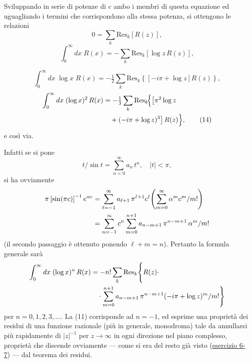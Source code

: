 \documentclass[11pt, a4paper]{book}
\numberwithin{equation}{section}
\begin{document}
Sviluppando in serie di potenze di $c$ ambo i membri di questa equazione
ed uguagliando i termini che corrispondono alla stessa potenza, si ottengono
le relazioni
\begin{equation}
    0 = \sum_k \mathrm{Res}_k\!\left[R(z)\right], \tag{11}
\end{equation}
\begin{equation}
    \int_0^\infty dx\; R(x) = -\sum_k \mathrm{Res}_k\!\left[\log z\, R(z)\right], \tag{12}
\end{equation}


\begin{equation}
    \int_0^\infty dx\; \log x\; R(x) = -\tfrac{1}{2}\sum_k \mathrm{Res}_k\!\left\{
    \left[-i\pi + \log z\right] R(z)\right\}, \tag{13}
\end{equation}
\begin{align}
    \int_0^\infty dx\;(\log x)^2\, R(x) &= -\tfrac{1}{3}\sum_k \mathrm{Res}_k\!\Bigl\{
    \bigl[\pi^2 \log z \notag\\
    &\quad + (-i\pi + \log z)^3\bigr]\, R(z)\Bigr\}, \tag{14}
\end{align}
e così via.

Infatti se si pone
\[
    t/\sin t = \sum_{n=0}^\infty a_n\, t^n, \quad |t| < \pi,
\]
si ha ovviamente
\begin{align}
    \pi\left[\sin(\pi c)\right]^{-1} e^{\alpha c}
    &= \sum_{\ell=-1}^\infty a_{\ell+1}\, \pi^{\ell+1} c^\ell
       \Biggl(\sum_{m=0}^\infty \alpha^m c^m / m!\Biggr) \notag\\
    &= \sum_{n=-1}^\infty c^n \sum_{m=0}^{n+1} a_{n-m+1}\, \pi^{n-m+1}\, \alpha^m / m!
\end{align}
(il secondo passaggio è ottenuto ponendo $\ell + m = n$). Pertanto la formula
generale sarà
\begin{align}
    \int_0^\infty dx\; (\log x)^n\, R(x) &= -n!\sum_k \mathrm{Res}_k\Biggl\{R(z)\cdot \notag\\
    &\quad \cdot \sum_{m=0}^{n+1} a_{n-m+1}\,\pi^{n-m+1}(-i\pi+\log z)^m / m!\Biggr\}
\end{align}
per $n = 0, 1, 2, 3, \ldots$\;. La (11) corrisponde ad $n = -1$, ed esprime una
proprietà dei residui di una funzione razionale (più in generale, monodroma)
tale da annullarsi più rapidamente di $|z|^{-1}$ per $z \to \infty$ in ogni
direzione nel piano complesso, proprietà che discende ovviamente --- come si
era del resto già visto (\uline{esercizio 6-7}) --- dal teorema dei residui.
\end{document}

